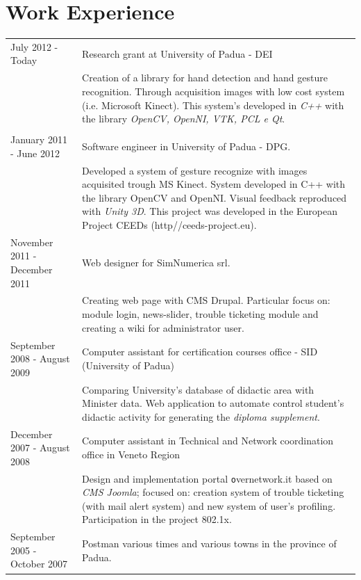 \documentclass[pdftex,a4paper,10pt,twoside,titlepage,italian]{article}
\begin{document}
\section*{Work Experience}
\begin{tabular}{l p{}}
July 2012 - Today & Research grant at University of Padua - DEI \\
& Creation of a library for  hand detection and hand gesture recognition.
Through acquisition images with low cost system (i.e. Microsoft Kinect). This system's developed in  
\textit{C++} with the library \textit{OpenCV, OpenNI, VTK, PCL e Qt}.\\
 & \\
January 2011 - June 2012 & Software engineer  in University of Padua - DPG.\\
& Developed a system of gesture recognize with images acquisited trough MS Kinect. System
developed in C++ with the library OpenCV and OpenNI. Visual feedback reproduced with \textit{Unity 3D}.
This project was developed in the European Project CEEDs (http//ceeds-project.eu).\\
November 2011 - December 2011 & Web designer for SimNumerica srl.\\
& Creating web page with CMS Drupal. Particular focus on: module login, news-slider, 
		trouble ticketing module and creating a wiki for administrator user.\\
September 2008 - August 2009 &  Computer assistant for certification courses office - SID (University of Padua)\\
& Comparing University's database of didactic area with Minister data.
 Web application to automate control student's didactic activity for generating the \textit{diploma supplement}.\\
 December 2007  -  August 2008 & Computer assistant in Technical and Network coordination office in Veneto Region\\
 & Design and implementation portal {\texttt overnetwork.it} based on \textit{CMS Joomla};
  focused on: creation system of trouble ticketing (with mail alert system) and new system of user's profiling. Participation in the project 802.1x.\\
 September 2005 - October 2007 & Postman various times and various towns in the province of Padua.
\end{tabular} 
\end{document}
